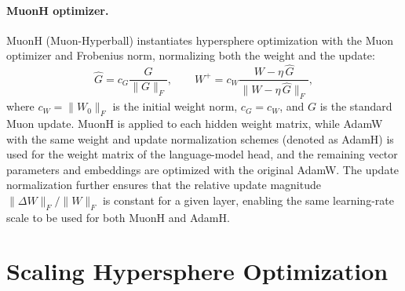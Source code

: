 \documentclass{article}
\begin{document}
\paragraph{MuonH optimizer.}
MuonH (Muon-Hyperball) \cite{wen2025hyperball_part1} instantiates hypersphere optimization with the Muon optimizer \cite{jordan2024muon} and Frobenius norm, normalizing both the weight and the update:
\begin{equation}
\widehat G = c_G \frac{G}{\|G\|_F}, \qquad W^{+} = c_W \frac{W - \eta \, \widehat G}{\|W - \eta \, \widehat G\|_F},
\label{eq:muonh_update}
\end{equation}
where $c_W = \|W_0\|_F$ is the initial weight norm, $c_G=c_W$, and $G$ is the standard Muon update. MuonH is applied to each hidden weight matrix, while AdamW \cite{adw} with the same weight and update normalization schemes (denoted as AdamH) is used for the weight matrix of the language-model head, and the remaining vector parameters and embeddings are optimized with the original AdamW.  The update normalization further ensures that the relative update magnitude $\|\Delta W\|_F / \|W\|_F$ is constant for a given layer, enabling the same learning-rate scale to be used for both MuonH and AdamH.




\section{Scaling Hypersphere Optimization}\label{sec:theory}
\end{document}
